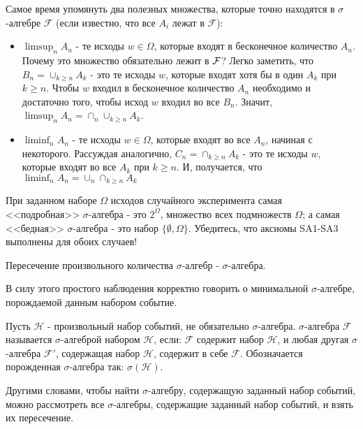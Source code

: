 {Самое время упомянуть два полезных множества, которые точно находятся в $\sigma$-алгебре $\mathcal{F}$ (если известно, что все $A_{i}$ лежат в $\mathcal{F}$):

\begin{itemize}
\item $\limsup_{n} A_{n}$ - те исходы $w\in\Omega$, которые входят в бесконечное количество $A_{n}$. Почему это множество обязательно лежит в $\mathcal{F}$? Легко заметить, что $B_{n}=\cup_{k\geq n} A_{k}$ - это те исходы $w$, которые входят хотя бы в один $A_{k}$ при $k\geq n$. Чтобы $w$ входил в бесконечное количество $A_{n}$ необходимо и достаточно того, чтобы исход $w$ входил во все $B_{n}$. Значит, $\limsup_{n} A_{n}=\cap_{n}\cup_{k\geq n} A_{k}$.

\item $\liminf_{n} A_{n}$ - те исходы $w\in\Omega$, которые входят во все $A_{n}$, начиная с некоторого. Рассуждая аналогично, $C_{n}=\cap_{k\geq n} A_{k}$ - это те исходы $w$, которые входят во все $A_{k}$ при $k\geq n$. И, получается, что $\liminf_{n} A_{n}=\cup_{n}\cap_{k\geq n}A_{k}$

\end{itemize}





\begin{myex} При заданном наборе $\Omega$ исходов случайного эксперимента самая <<подробная>> $\sigma$-алгебра - это $2^{\Omega}$, множество всех подмножеств $\Omega$; а самая <<бедная>> $\sigma$-алгебра - это набор $\{\emptyset,\Omega\}$. Убедитесь, что аксиомы SA1-SA3 выполнены для обоих случаев!
\end{myex}




\begin{myth} Пересечение произвольного количества $\sigma$-алгебр - $\sigma$-алгебра.
\end{myth}
В силу этого простого наблюдения корректно говорить о минимальной $\sigma$-алгебре, порождаемой данным набором событие.

\begin{mydef} Пусть $\mathcal{H}$ - произвольный набор событий, не обязательно $\sigma$-алгебра. $\sigma$-алгебра $\mathcal{F}$ называется  $\sigma$-алгеброй  набором $\mathcal{H}$, если: $\mathcal{F}$ содержит набор $\mathcal{H}$, и любая другая $\sigma$-алгебра $\mathcal{F}'$, содержащая набор $\mathcal{H}$, содержит в себе $\mathcal{F}$. Обозначается порожденная $\sigma$-алгебра так: $\sigma(\mathcal{H})$.
\end{mydef}
Другими словами, чтобы найти $\sigma$-алгебру, содержащую заданный набор событий, можно рассмотреть все $\sigma$-алгебры, содержащие заданный набор событий, и взять их пересечение.

}
